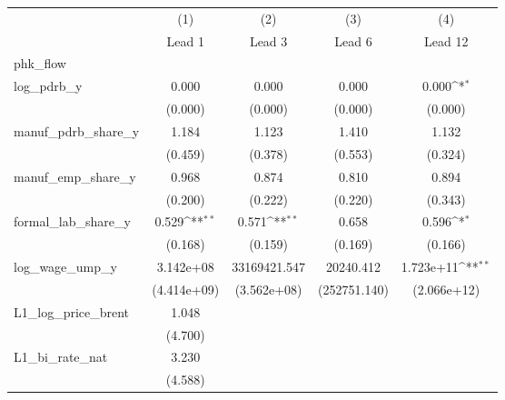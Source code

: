{
\def\sym#1{\ifmmode^{#1}\else\(^{#1}\)\fi}
\begin{tabular}{l*{4}{c}}
\toprule
                &\multicolumn{1}{c}{(1)}&\multicolumn{1}{c}{(2)}&\multicolumn{1}{c}{(3)}&\multicolumn{1}{c}{(4)}\\
                &\multicolumn{1}{c}{Lead 1}&\multicolumn{1}{c}{Lead 3}&\multicolumn{1}{c}{Lead 6}&\multicolumn{1}{c}{Lead 12}\\
\midrule
phk\_flow        &                  &                  &                  &                  \\
log\_pdrb\_y      &    0.000         &    0.000         &    0.000         &    0.000\sym{*}  \\
                &  (0.000)         &  (0.000)         &  (0.000)         &  (0.000)         \\
\addlinespace
manuf\_pdrb\_share\_y&    1.184         &    1.123         &    1.410         &    1.132         \\
                &  (0.459)         &  (0.378)         &  (0.553)         &  (0.324)         \\
\addlinespace
manuf\_emp\_share\_y&    0.968         &    0.874         &    0.810         &    0.894         \\
                &  (0.200)         &  (0.222)         &  (0.220)         &  (0.343)         \\
\addlinespace
formal\_lab\_share\_y&    0.529\sym{**} &    0.571\sym{**} &    0.658         &    0.596\sym{*}  \\
                &  (0.168)         &  (0.159)         &  (0.169)         &  (0.166)         \\
\addlinespace
log\_wage\_ump\_y  &3.142e+08         &33169421.547         &20240.412         &1.723e+11\sym{**} \\
                &(4.414e+09)         &(3.562e+08)         &(252751.140)         &(2.066e+12)         \\
\addlinespace
L1\_log\_price\_brent&    1.048         &                  &                  &                  \\
                &  (4.700)         &                  &                  &                  \\
\addlinespace
L1\_bi\_rate\_nat  &    3.230         &                  &                  &                  \\
                &  (4.588)         &                  &                  &                  \\

\end{tabular}}
